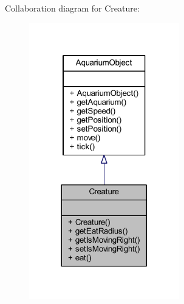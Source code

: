 Collaboration diagram for Creature\+:
\nopagebreak
\begin{figure}[H]
\begin{center}
\leavevmode
\includegraphics[width=185pt]{class_creature__coll__graph}
\end{center}
\end{figure}
